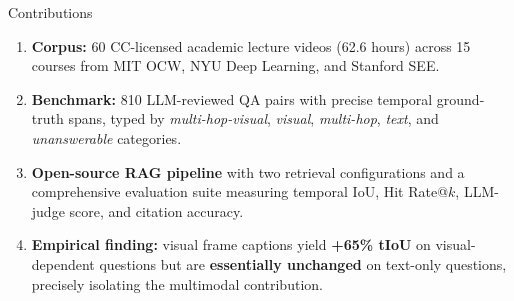 \documentclass[aspectratio=169,t]{beamer}
\begin{document}
\begin{frame}{Contributions}

\begin{enumerate}
  \setlength{\itemsep}{10pt}
  \item \textbf{Corpus:} 60 CC-licensed academic lecture videos (62.6 hours) across
        15 courses from MIT OCW, NYU Deep Learning, and Stanford SEE.

  \item \textbf{Benchmark:} 810 LLM-reviewed QA pairs with precise temporal ground-truth
        spans, typed by \emph{multi-hop-visual}, \emph{visual}, \emph{multi-hop},
        \emph{text}, and \emph{unanswerable} categories.

  \item \textbf{Open-source RAG pipeline} with two retrieval configurations and a
        comprehensive evaluation suite measuring temporal IoU, Hit Rate@$k$,
        LLM-judge score, and citation accuracy.

  \item \textbf{Empirical finding:} visual frame captions yield \textbf{+65\% tIoU}
        on visual-dependent questions but are \textbf{essentially unchanged} on
        text-only questions, precisely isolating the multimodal contribution.
\end{enumerate}

\end{frame}
\end{document}
